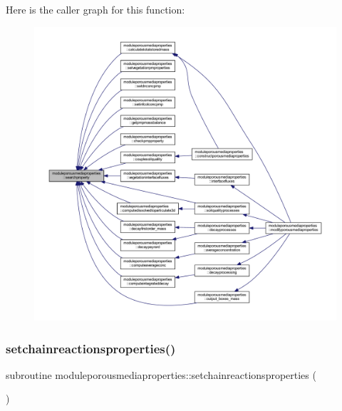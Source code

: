 Here is the caller graph for this function\+:\nopagebreak
\begin{figure}[H]
\begin{center}
\leavevmode
\includegraphics[width=350pt]{namespacemoduleporousmediaproperties_af651cef8320f1769d6f02a15144aae88_icgraph}
\end{center}
\end{figure}
\mbox{\label{namespacemoduleporousmediaproperties_a4eef1ed87ef643f7f98c8302286a6eb1}} 
\subsubsection{\texorpdfstring{setchainreactionsproperties()}{setchainreactionsproperties()}}
{\footnotesize\ttfamily subroutine moduleporousmediaproperties\+::setchainreactionsproperties (\begin{DoxyParamCaption}{ }\end{DoxyParamCaption})\hspace{0.3cm}{\ttfamily [private]}}

